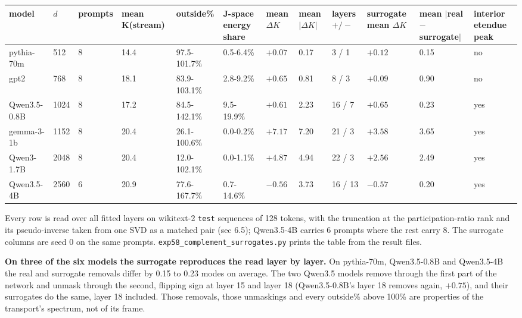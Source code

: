 \documentclass[10pt,letterpaper,twocolumn]{article}
\begin{document}
\begin{table}[tp]
\centering\footnotesize
\begin{tabular}{L{0.100\textwidth}L{0.033\textwidth}L{0.058\textwidth}L{0.075\textwidth}L{0.092\textwidth}L{0.079\textwidth}L{0.038\textwidth}L{0.035\textwidth}L{0.050\textwidth}L{0.076\textwidth}L{0.089\textwidth}L{0.074\textwidth}}
\toprule
model & \(d\) & prompts & mean K(stream) & outside\% & J-space energy share & mean \(\Delta K\) & mean \(\lvert\Delta K\rvert\) & layers \(+/-\) & surrogate mean \(\Delta K\) & mean \(\lvert\)real \(-\) surrogate\(\rvert\) & interior etendue peak \\
\midrule
pythia-70m & 512 & 8 & 14.4 & 97.5-101.7\% & 0.5-6.4\% & \(+0.07\) & 0.17 & 3 / 1 & \(+0.12\) & 0.15 & no \\
gpt2 & 768 & 8 & 18.1 & 83.9-103.1\% & 2.8-9.2\% & \(+0.65\) & 0.81 & 8 / 3 & \(+0.09\) & 0.90 & no \\
Qwen3.5-0.8B & 1024 & 8 & 17.2 & 84.5-142.1\% & 9.5-19.9\% & \(+0.61\) & 2.23 & 16 / 7 & \(+0.65\) & 0.23 & yes \\
gemma-3-1b & 1152 & 8 & 20.4 & 26.1-100.6\% & 0.0-0.2\% & \(+7.17\) & 7.20 & 21 / 3 & \(+3.58\) & 3.65 & yes \\
Qwen3-1.7B & 2048 & 8 & 20.4 & 12.0-102.1\% & 0.0-1.1\% & \(+4.87\) & 4.94 & 22 / 3 & \(+2.56\) & 2.49 & yes \\
Qwen3.5-4B & 2560 & 6 & 20.9 & 77.6-167.7\% & 0.7-14.6\% & \(-0.56\) & 3.73 & 16 / 13 & \(-0.57\) & 0.20 & yes \\
\bottomrule
\end{tabular}
\end{table}

Every row is read over all fitted layers on wikitext-2 \texttt{test} sequences of 128 tokens, with the
truncation at the participation-ratio rank and its pseudo-inverse taken from one SVD as a matched
pair (sec 6.5); Qwen3.5-4B carries 6 prompts where the rest carry 8. The surrogate columns are seed
0 on the same prompts. \texttt{exp58\_\allowbreak{}complement\_\allowbreak{}surrogates.\allowbreak{}py} prints the table from the result files.

\textbf{On three of the six models the surrogate reproduces the read layer by layer.} On pythia-70m,
Qwen3.5-0.8B and Qwen3.5-4B the real and surrogate removals differ by 0.15 to 0.23 modes on
average. The two Qwen3.5 models remove through the first part of the network and
unmask through the second, flipping sign at layer 15 and layer 18 (Qwen3.5-0.8B's layer 18 removes
again, \(+0.75\)), and their surrogates do the same, layer 18 included.
Those removals, those unmaskings and every outside\% above 100\% are properties of the transport's
spectrum, not of its frame.
\end{document}
